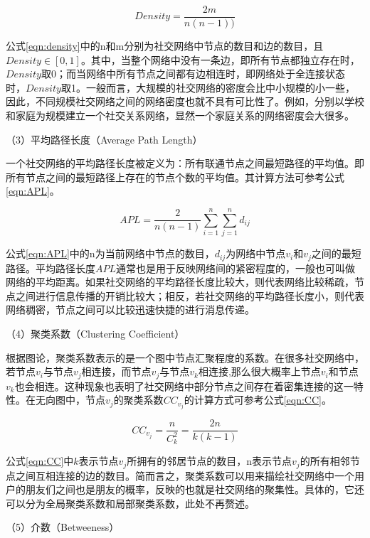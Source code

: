 \begin{equation}
  \label{eqn:density}
  Density=\frac{2m}{n(n-1))} 
\end{equation}

公式\ref{eqn:density}中的n和m分别为社交网络中节点的数目和边的数目，且$Density\in [0,1]$。其中，当整个网络中没有一条边，即所有节点都独立存在时，$Density$取0；而当网络中所有节点之间都有边相连时，即网络处于全连接状态时，$Density$取1。一般而言，大规模的社交网络的密度会比中小规模的小一些，因此，不同规模社交网络之间的网络密度也就不具有可比性了。例如，分别以学校和家庭为规模建立一个社交关系网络，显然一个家庭关系的网络密度会大很多。

（3）平均路径长度（Average Path Length）

一个社交网络的平均路径长度被定义为：所有联通节点之间最短路径的平均值。即所有节点之间的最短路径上存在的节点个数的平均值。其计算方法可参考公式\ref{eqn:APL}。

\begin{equation}
  \label{eqn:APL}
  APL=\frac{2}{n(n-1)}\sum _{i=1}^{n}\sum_{j=1}^{n}d_{ij}
\end{equation}

公式\ref{eqn:APL}中的n为当前网络中节点的数目，$d_{ij}$为网络中节点$v_i$和$v_j$之间的最短路径。平均路径长度$APL$通常也是用于反映网络间的紧密程度的，一般也可叫做网络的平均距离。如果社交网络的平均路径长度比较大，则代表网络比较稀疏，节点之间进行信息传播的开销比较大；相反，若社交网络的平均路径长度小，则代表网络稠密，节点之间可以比较迅速快捷的进行消息传递。

（4）聚类系数（Clustering Coefficient）

根据图论，聚类系数表示的是一个图中节点汇聚程度的系数。在很多社交网络中，若节点$v_i$与节点$v_j$相连接，而节点$v_j$与节点$v_k$相连接,那么很大概率上节点$v_i$和节点$v_k$也会相连。这种现象也表明了社交网络中部分节点之间存在着密集连接的这一特性。在无向图中，节点$v_j$的聚类系数$CC_{v_j}$的计算方式可参考公式\ref{eqn:CC}。

\begin{equation}
  \label{eqn:CC}
  CC_{v_j}=\frac{n}{C_k^2}=\frac{2n}{k(k-1)}
\end{equation}

公式\ref{eqn:CC}中$k$表示节点$v_j$所拥有的邻居节点的数目，n表示节点$v_j$的所有相邻节点之间互相连接的边的数目。简而言之，聚类系数可以用来描绘社交网络中一个用户的朋友们之间也是朋友的概率，反映的也就是社交网络的聚集性。具体的，它还可以分为全局聚类系数和局部聚类系数，此处不再赘述。

（5）介数（Betweeness）

